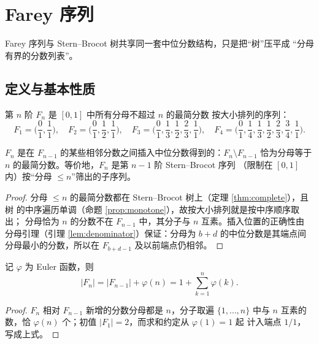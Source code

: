 \section{Farey 序列}\label{sec:farey}

Farey 序列与 Stern--Brocot 树共享同一套中位分数结构，只是把``树''压平成
``分母有界的分数列表''。

\subsection{定义与基本性质}

\begin{definition}[Farey 序列]
第 $n$ 阶  $F_n$ 是 $[0,1]$ 中所有分母不超过 $n$ 的最简分数
按大小排列的序列：
\[
  F_1=\Big(\frac01,\frac11\Big),\quad
  F_2=\Big(\frac01,\frac12,\frac11\Big),\quad
  F_3=\Big(\frac01,\frac13,\frac12,\frac23,\frac11\Big),\quad
  F_4=\Big(\frac01,\frac14,\frac13,\frac12,\frac23,\frac34,\frac11\Big).
\]
\end{definition}

\begin{proposition}\label{prop:farey-sub}
$F_n$ 是在 $F_{n-1}$ 的某些相邻分数之间插入中位分数得到的：$F_n\setminus F_{n-1}$
恰为分母等于 $n$ 的最简分数。等价地，$F_n$ 是第 $n-1$ 阶 Stern--Brocot 序列
（限制在 $[0,1]$ 内）按``分母 $\le n$''筛出的子序列。
\end{proposition}

\begin{proof}
分母 $\le n$ 的最简分数都在 Stern--Brocot 树上（定理 \ref{thm:complete}），且树
的中序遍历单调（命题 \ref{prop:monotone}），故按大小排列就是按中序顺序取出；
分母恰为 $n$ 的分数不在 $F_{n-1}$ 中，其分子与 $n$ 互素。插入位置的正确性由
分母引理（引理 \ref{lem:denominator}）保证：分母为 $b+d$ 的中位分数是其端点间
分母最小的分数，所以在 $F_{b+d-1}$ 及以前端点仍相邻。
\end{proof}

\begin{corollary}[长度公式]\label{cor:farey-length}
记 $\varphi$ 为 Euler 函数，则
\[
  |F_n|=|F_{n-1}|+\varphi(n)=1+\sum_{k=1}^{n}\varphi(k).
\]
\end{corollary}

\begin{proof}
$F_n$ 相对 $F_{n-1}$ 新增的分数分母都是 $n$，分子取遍 $\{1,\ldots,n\}$ 中与 $n$
互素的数，恰 $\varphi(n)$ 个；初值 $|F_1|=2$，而求和约定从 $\varphi(1)=1$ 起
计入端点 $1/1$，写成上式。
\end{proof}

